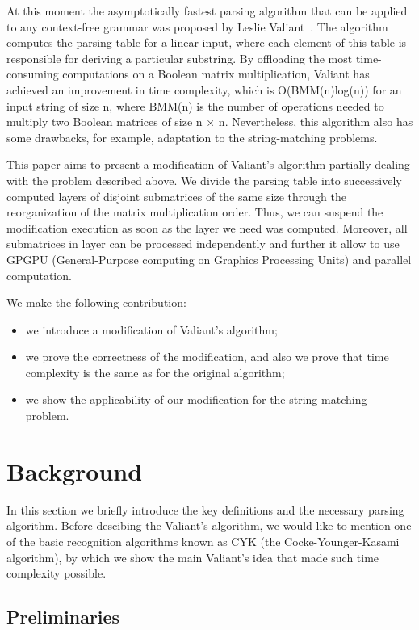 \documentclass[runningheads]{llncs}
\begin{document}
At this moment the asymptotically fastest parsing algorithm that can be applied to any context-free grammar was proposed by Leslie Valiant~\cite{valiant}. The algorithm computes the parsing table for a linear input, where each element of this table is responsible for deriving a particular substring. By offloading the most time-consuming computations on a Boolean matrix multiplication, Valiant has achieved an improvement in time complexity, which is O(BMM(n)log(n)) for an input string of size n, where BMM(n) is the number of operations needed to multiply two Boolean matrices of size n × n. Nevertheless, this algorithm also has some drawbacks, for example, adaptation to the string-matching problems. 

This  paper  aims  to  present  a  modification  of  Valiant's  algorithm partially dealing with the problem described above. We divide the parsing table into successively computed layers of disjoint submatrices of the same size through the reorganization of the matrix multiplication order. Thus, we can suspend the modification execution as soon as the layer we need was computed. Moreover, all submatrices in layer can be processed independently and further it allow to use GPGPU (General-Purpose computing on Graphics Processing Units) and parallel computation.

We make the following contribution:
\begin{itemize}
    \item we introduce a  modification  of  Valiant's  algorithm;
    \item we prove the correctness of the modification, and also we prove that time complexity is the same as for the original algorithm;
    \item we show the applicability of our modification for the string-matching problem.
\end{itemize}

\section{Background}

In this section we briefly introduce the key definitions and the necessary parsing algorithm. Before descibing the Valiant's  algorithm, we would like to mention one of the basic recognition algorithms known as CYK (the Cocke-Younger-Kasami algorithm), by which we show the main Valiant's idea that made such time complexity possible.

\subsection{Preliminaries}
\end{document}
